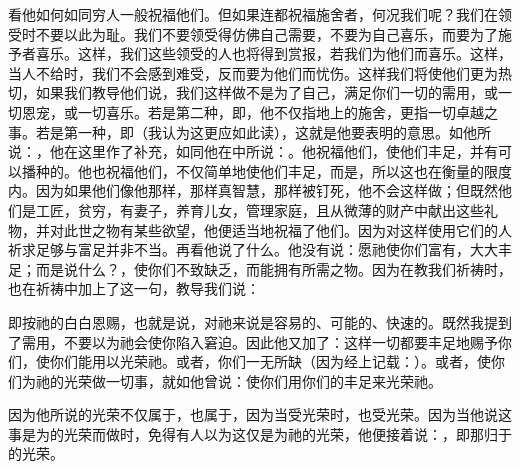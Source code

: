 \par

看他如何如同穷人一般祝福他们。但如果连都祝福施舍者，何况我们呢？我们在领受时不要以此为耻。我们不要领受得仿佛自己需要，不要为自己喜乐，而要为了施予者喜乐。这样，我们这些领受的人也将得到赏报，若我们为他们而喜乐。这样，当人不给时，我们不会感到难受，反而要为他们而忧伤。这样我们将使他们更为热切，如果我们教导他们说，我们这样做不是为了自己，满足你们一切的需用，或一切恩宠，或一切喜乐。若是第二种，即，他不仅指地上的施舍，更指一切卓越之事。若是第一种，即（我认为这更应如此读），这就是他要表明的意思。如他所说：，他在这里作了补充，如同他在中所说：。他祝福他们，使他们丰足，并有可以播种的。他也祝福他们，不仅简单地使他们丰足，而是，所以这也在衡量的限度内。因为如果他们像他那样，那样真智慧，那样被钉死，他不会这样做；但既然他们是工匠，贫穷，有妻子，养育儿女，管理家庭，且从微薄的财产中献出这些礼物，并对此世之物有某些欲望，他便适当地祝福了他们。因为对这样使用它们的人祈求足够与富足并非不当。再看他说了什么。他没有说：愿祂使你们富有，大大丰足；而是说什么？，使你们不致缺乏，而能拥有所需之物。因为在教我们祈祷时，也在祈祷中加上了这一句，教导我们说：\par

\par

即按祂的白白恩赐，也就是说，对祂来说是容易的、可能的、快速的。既然我提到了需用，不要以为祂会使你陷入窘迫。因此他又加了：这样一切都要丰足地赐予你们，使你们能用以光荣祂。或者，你们一无所缺（因为经上记载：）。或者，使你们为祂的光荣做一切事，就如他曾说：使你们用你们的丰足来光荣祂。\par

 因为他所说的光荣不仅属于，也属于，因为当受光荣时，也受光荣。因为当他说这事是为的光荣而做时，免得有人以为这仅是为祂的光荣，他便接着说：，即那归于的光荣。\par

